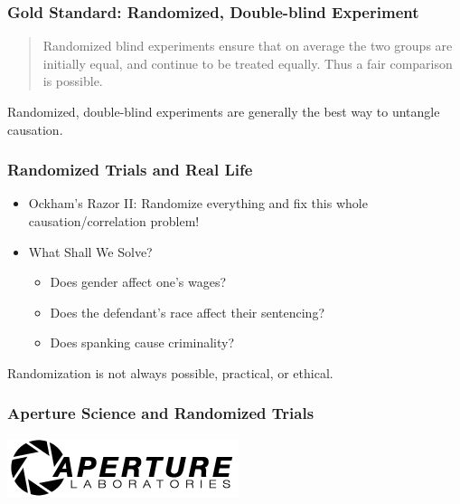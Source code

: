 \documentclass{beamer}
\begin{document}
\begin{frame}
\frametitle{Gold Standard: Randomized, Double-blind Experiment}
	\begin{quote}
		Randomized blind experiments ensure that on average the two groups are initially equal, and continue to be treated equally. Thus a fair comparison is possible.
	\end{quote}
	
	\vspace{2em}
	\begin{alertblock}{Randomized, double-blind experiments are generally the best way to untangle causation.}
	\end{alertblock}
\end{frame}

\begin{frame}
\frametitle{Randomized Trials and Real Life}
	\begin{itemize}[<+- | alert@+>]
		\item \alert{Ockham's Razor II:} Randomize everything and fix this whole causation/correlation problem!
		\item What Shall We Solve?
			\begin{itemize}
				\item Does gender affect one's wages?
				\item Does the defendant's race affect their sentencing?
				\item Does spanking cause criminality?
			\end{itemize}
		\end{itemize}
\end{frame}

\begin{frame}
	\Huge{Randomization is not always possible, practical, or ethical.}
\end{frame}

\begin{frame}
	\frametitle{Aperture Science and Randomized Trials}
	\begin{center}
		\includegraphics[scale=1]{./images/aperture.png}
	\end{center}
	\href{run:./sound/Cave_Johnson_mandatory_testing.wav}{}
	\href{run:./sound/Cave_Johnson_control1.wav}{}
	\href{run:./sound/Cave_Johnson_control2.wav}{}
\end{frame}
\end{document}
